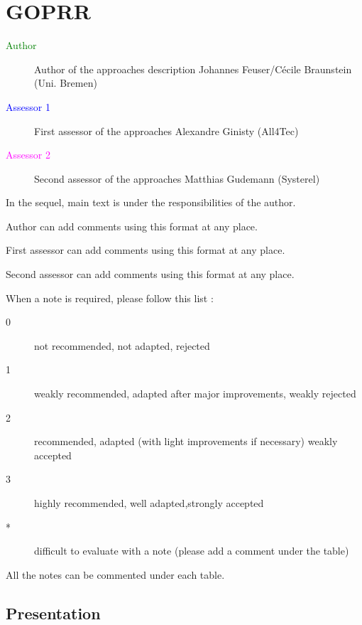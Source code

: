 \chapter{GOPRR}

\begin{description}
\item[\textcolor{green}{Author}] Author of the approaches description
  Johannes Feuser/C\'ecile Braunstein  (Uni. Bremen)
\item[\textcolor{blue}{Assessor 1}] First assessor of the approaches Alexandre Ginisty (All4Tec)
\item[\textcolor{magenta}{Assessor 2}] Second assessor of the approaches Matthias Gudemann (Systerel)
\end{description}

In the sequel, main text is under the responsibilities of the author.

\begin{author_comment}
Author can add comments using this format at any place.
\end{author_comment}

\begin{assessor1}
First assessor can add comments using this format at any place.
\end{assessor1}

\begin{assessor2}
Second assessor can add comments using this format at any place.
\end{assessor2}

When a note is required, please follow this list :
\begin{description}
\item[0] not recommended, not adapted, rejected
\item[1] weakly recommended, adapted after major improvements, weakly rejected
\item[2] recommended, adapted (with light improvements if necessary)  weakly accepted
\item[3] highly recommended, well adapted,strongly accepted
\item[*] difficult to evaluate with a note (please add a comment under the table)
\end{description}

All the notes can be commented under each table.

\section{Presentation}

